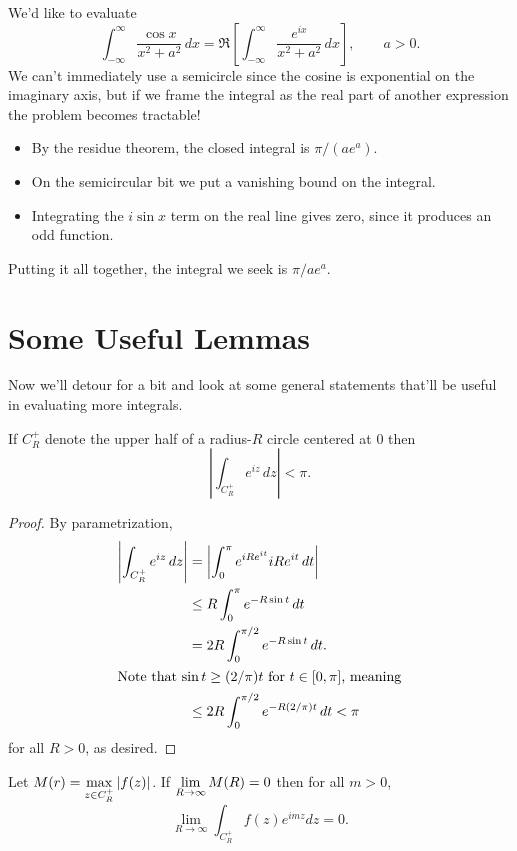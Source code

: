 \documentclass[../m136main.tex]{subfiles}
\begin{document}
\begin{example}
    We'd like to evaluate
    \[ \int_{-\infty}^{\infty} \frac{\cos x}{x^2 + a^2} \,dx = \Re \left[ \int_{-\infty}^{\infty} \frac{e^{ix}}{x^2 + a^2} \,dx \right], \qquad a > 0. \]
    We can't immediately use a semicircle since the cosine is exponential on the imaginary axis, but if we frame the integral as the real part of another expression the problem becomes tractable!
    \begin{itemize}[topsep=0pt]
        \item By the residue theorem, the closed integral is $\pi / (ae^{a})$.
        \item On the semicircular bit we put a vanishing bound on the integral.
        \item Integrating the $i \sin x$ term on the real line gives zero, since it produces an odd function.
    \end{itemize}
    Putting it all together, the integral we seek is $\pi / a e^{a}$.
\end{example}

\section{Some Useful Lemmas}
Now we'll detour for a bit and look at some general statements that'll be useful in evaluating more integrals.

\begin{lemma}
    If $C_R^+$ denote the upper half of a radius-$R$ circle centered at 0 then
    \[ \left| \int_{C_R^+} e^{iz} \,dz \right| < \pi. \]
\end{lemma}


\begin{proof}
    By parametrization,
    \begin{align*}
        \left| \int_{C_R^+} e^{iz} \,dz \right| &= \left| \int_{0}^{\pi} e^{iR e^{it}} iR e^{it} \,dt \right| \\
        &\leq R \int_{0}^{\pi} e^{-R \sin t} \,dt \\
        &= 2R \int_{0}^{\pi / 2} e^{-R \sin t} \,dt. \\
        \intertext{Note that $\sin t \geq (2 / \pi) t$ for $t \in [0, \pi]$, meaning}
        &\leq 2R \int_{0}^{\pi / 2} e^{-R (2 / \pi) t} \,dt < \pi
    \end{align*}
    for all $R > 0$, as desired.
\end{proof}

\begin{lemma}
    Let $\displaystyle M(r) = \max_{z \in C_R^+} |f(z)|$. \vspace{-12pt}
    If $\displaystyle \lim_{R \to \infty} M(R) = 0$ then for all $m > 0$,
    \[ \lim_{R \to \infty} \int_{C_R^+} f(z) e^{i m z} dz = 0. \]
\end{lemma}
\end{document}
